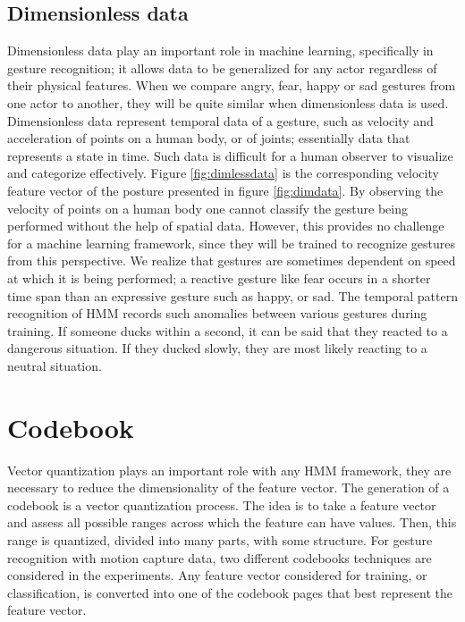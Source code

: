 \documentclass[]{report}   %
\begin{document}
\subsection*{Dimensionless data}
Dimensionless data play an important role in machine learning, specifically in gesture recognition; it allows data to be generalized for any actor regardless of their physical features. When we compare angry, fear, happy or sad gestures from one actor to another, they will be quite similar when dimensionless data is used. Dimensionless data represent temporal data of a gesture, such as velocity and acceleration of points on a human body, or of joints; essentially data that represents a state in time. Such data is difficult for a human observer to visualize and categorize effectively. Figure \ref{fig:dimlessdata} is the corresponding velocity feature vector of the posture presented in figure \ref{fig:dimdata}.  By observing the velocity of points on a human body one cannot classify the gesture being performed without the help of spatial data. However, this provides no challenge for a machine learning framework, since they will be trained to recognize gestures from this perspective. We realize that gestures are sometimes dependent on speed at which it is being performed; a reactive gesture like fear occurs in a shorter time span than an expressive gesture such as happy, or sad. The temporal pattern recognition of HMM records such anomalies between various gestures during training\cite{Yang_1994_329, 54527}. If someone ducks within a second, it can be said that they reacted to a dangerous situation. If they ducked slowly, they are most likely reacting to a neutral situation. 


\section{Codebook}
Vector quantization plays an important role with any HMM framework, they are necessary to reduce the dimensionality of the feature vector. The generation of a codebook is a vector quantization process. The idea is to take a feature vector and assess all possible ranges across which the feature can have values. Then, this range is quantized, divided into many parts, with some structure. For gesture recognition with motion capture data, two different codebooks techniques are considered in the experiments. Any feature vector considered for training, or classification, is converted into one of the codebook pages that best represent the feature vector.
\end{document}
